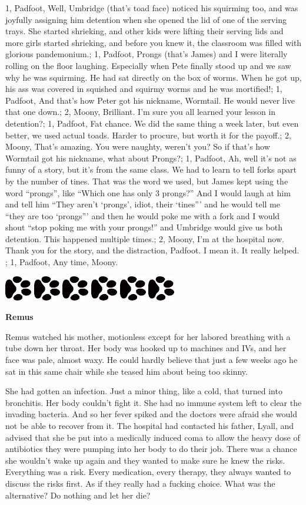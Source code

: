 \documentclass[12pt,twoside,openright]{memoir}
\newcommand\smsFrom{1}
\newcommand\smsTo{2}
\newcommand{\dogPrintRule}{	
	\begin{center}
		\hspace{.5em}
		\includegraphics[angle=60]{dogprint.pdf}
		\hspace{.5em}
		\includegraphics[angle=120]{dogprint.pdf}
		\hspace{.5em}
		\includegraphics[angle=60]{dogprint.pdf}
		\hspace{.5em}
		\includegraphics[angle=120]{dogprint.pdf}
		\hspace{.5em}
		\includegraphics[angle=60]{dogprint.pdf}
		\hspace{.5em}
		\includegraphics[angle=120]{dogprint.pdf}
		\hspace{.5em}
	\end{center}
}
\begin{document}
{\smsFrom, {Padfoot}, {Well, Umbridge (that's toad face) noticed his squirming too, and was joyfully assigning him detention when she opened the lid of one of the serving trays. She started shrieking, and other kids were lifting their serving lids and more girls started shrieking, and before you knew it, the classroom was filled with glorious pandemonium.};
\smsFrom, {Padfoot}, {Prongs (that's James) and I were literally rolling on the floor laughing. Especially when Pete finally stood up and we saw why he was squirming. He had sat directly on the box of worms. When he got up, his ass was covered in squished and squirmy worms and he was mortified!};
\smsFrom, {Padfoot}, {And that's how Peter got his nickname, Wormtail. He would never live that one down.};
\smsTo, {Moony}, { Brilliant. I'm sure you all learned your lesson in detention?};
\smsFrom, {Padfoot}, {Fat chance. We did the same thing a week later, but even better, we used actual toads. Harder to procure, but worth it for the payoff.};
\smsTo, {Moony}, { That's amazing. You were naughty, weren't you? So if that's how Wormtail got his nickname, what about Prongs?};
\smsFrom, {Padfoot}, {Ah, well it's not as funny of a story, but it's from the same class. We had to learn to tell forks apart by the number of tines. That was the word we used, but James kept using the word ``prongs'', like ``Which one has only 3 prongs?'' And I would laugh at him and tell him ``They aren't ‘prongs', idiot, their ‘tines''' and he would tell me
``they are too ‘prongs''' and then he would poke me with a fork and I would shout ``stop poking me with your prongs!'' and Umbridge would give us both detention. This happened multiple times.};
\smsTo, {Moony}, {I'm at the hospital now. Thank you for the story, and the distraction, Padfoot. I mean it. It really helped. };
\smsFrom, {Padfoot}, {Any time, Moony.}
}
\dogPrintRule

\textbf{Remus} 

Remus watched his mother, motionless except for her labored breathing with a tube down her throat. Her body was hooked up to machines and IVs, and her face was pale, almost waxy. He could hardly believe that just a few weeks ago he sat in this same chair while she teased him about being too skinny. 

She had gotten an infection. Just a minor thing, like a cold, that turned into bronchitis. Her body couldn't fight it. She had no immune system left to clear the invading bacteria. And so her fever spiked and the doctors were afraid she would not be able to recover from it. The hospital had contacted his father, Lyall, and advised that she be put into a medically induced coma to allow the heavy dose of antibiotics they were pumping into her body to do their job. There was a chance she wouldn't wake up again and they wanted to make sure he knew the risks. Everything was a risk. Every medication, every therapy, they always wanted to discuss the risks first. As if they really had a fucking choice. What was the alternative? Do nothing and let her die?
\end{document}
